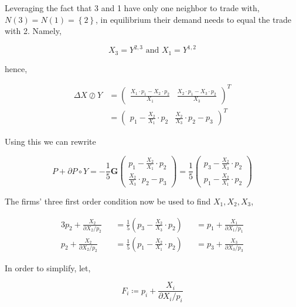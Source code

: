\documentclass[american]{scrartcl}
\newcommand{\matr}[1]{\bm{#1}}
\newcommand{\set}[1]{\left\{#1\right\}}
\begin{document}
Leveraging the fact that 3 and 1 have only one neighbor to trade with, $N(3) = N(1) = \set{2}$, in equilibrium their demand needs to equal the trade with 2. Namely,

\begin{equation}
	X_3 = Y^{2, 3} \text{ and } X_1 = Y^{1, 2}
\end{equation}

hence,

\begin{equation}
	\begin{split}
		\Delta X \oslash Y &= \begin{pmatrix}
			\frac{X_1 \cdot p_1 - X_2 \cdot p_2}{X_1} &
			\frac{X_2 \cdot p_1 - X_3 \cdot p_2}{X_3}
		\end{pmatrix}^{T} \\
		&= \begin{pmatrix}
			p_1 - \frac{X_2}{X_1} \cdot p_2 &
			\frac{X_2}{X_3} \cdot p_2 - p_3
		\end{pmatrix}^{T}
	\end{split}
\end{equation}

Using this we can rewrite

\begin{equation}
	P + \partial P \circ Y = - \frac{1}{5} \matr{G} \begin{pmatrix}
		p_1 - \frac{X_2}{X_1} \cdot p_2 \\
		\frac{X_2}{X_3} \cdot p_2 - p_3
	\end{pmatrix} = \frac{1}{5} \begin{pmatrix}
		p_3 - \frac{X_2}{X_3} \cdot p_2 \\
		p_1 - \frac{X_2}{X_1} \cdot p_2
	\end{pmatrix}
\end{equation}

The firms' three first order condition now be used to find $X_1, X_2, X_3$,

\begin{alignat*}{3}
	p_2 + \frac{X_2}{\partial X_2 / p_2} &  & = \frac{1}{5} \left( p_3 - \frac{X_2}{X_3} \cdot p_2  \right) &  & = p_1 + \frac{X_1}{\partial X_1 / p_1} \\
	p_2 + \frac{X_2}{\partial X_2 / p_2} &  & = \frac{1}{5} \left( p_1 - \frac{X_2}{X_1} \cdot p_2  \right) &  & = p_3 + \frac{X_3}{\partial X_3 / p_3}
\end{alignat*}

In order to simplify, let,

\begin{equation}
	F_i \coloneqq p_i +  \frac{X_i}{\partial X_i / p_i}
\end{equation}
\end{document}
